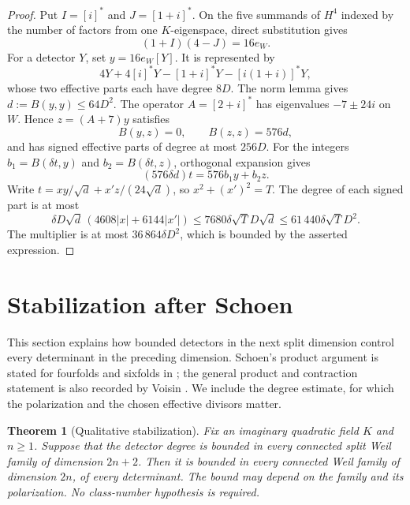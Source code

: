 \documentclass[11pt]{article}
\newtheorem{theorem}{Theorem}[section]
\theoremstyle{definition}
\theoremstyle{remark}
\begin{document}
\begin{proof}
Put $I=[i]^*$ and $J=[1+i]^*$. On the five summands of $H^4$ indexed by the number of factors from one $K$-eigenspace, direct substitution gives
\[
 (1+I)(4-J)=16e_W.
\]
For a detector $Y$, set $y=16e_W[Y]$. It is represented by
\[
 4Y+4[i]^*Y-[1+i]^*Y-[i(1+i)]^*Y,
\]
whose two effective parts each have degree $8D$. The norm lemma gives $d:=B(y,y)\leq64D^2$. The operator $A=[2+i]^*$ has eigenvalues $-7\pm24i$ on $W$. Hence $z=(A+7)y$ satisfies
\[
 B(y,z)=0,\qquad B(z,z)=576d,
\]
and has signed effective parts of degree at most $256D$. For the integers $b_1=B(\delta t,y)$ and $b_2=B(\delta t,z)$, orthogonal expansion gives
\[
 (576\delta d)t=576b_1y+b_2z.
\]
Write $t=x y/\sqrt d+x' z/(24\sqrt d)$, so $x^2+(x')^2=T$. The degree of each signed part is at most
\[
 \delta D\sqrt d\,(4608|x|+6144|x'|)
 \leq7680\delta\sqrt T D\sqrt d
 \leq61\,440\delta\sqrt T D^2.
\]
The multiplier is at most $36\,864\delta D^2$, which is bounded by the asserted expression.
\end{proof}

\section{Stabilization after Schoen}
\label{sec:stabilization}

This section explains how bounded detectors in the next split dimension control every determinant in the preceding dimension. Schoen's product argument is stated for fourfolds and sixfolds in \cite[Proposition~10, pp.~332--333]{Schoen98}; the general product and contraction statement is also recorded by Voisin \cite[Lemma~2.9]{VoisinB}. We include the degree estimate, for which the polarization and the chosen effective divisors matter.

\begin{theorem}[Qualitative stabilization]\label{thm:stabilization}
Fix an imaginary quadratic field $K$ and $n\geq1$. Suppose that the detector degree is bounded in every connected split Weil family of dimension $2n+2$. Then it is bounded in every connected Weil family of dimension $2n$, of every determinant. The bound may depend on the family and its polarization. No class-number hypothesis is required.
\end{theorem}
\end{document}
